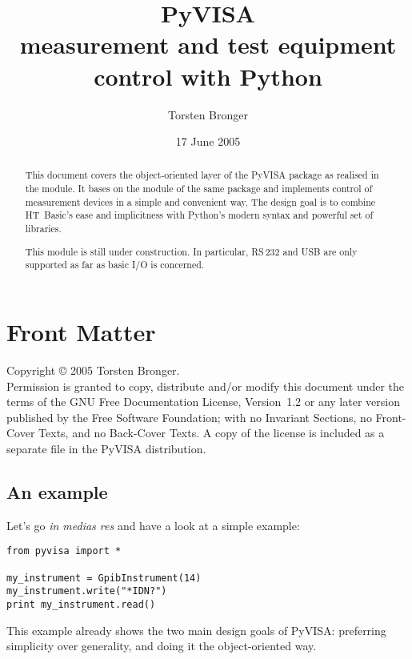 \documentclass{howto}
\title{PyVISA\\[0.5ex]\large measurement and test equipment control with Python}
\author{Torsten Bronger}
\date{17 June 2005}
\begin{document}
\maketitle

\ifhtml
\chapter*{Front Matter\label{front}}
\fi

Copyright \copyright{} 2005 Torsten Bronger.\\
Permission is granted to copy, distribute and/or modify this document under the
terms of the GNU Free Documentation License, Version~1.2 or any later version
published by the Free Software Foundation; with no Invariant Sections, no
Front-Cover Texts, and no Back-Cover Texts.  A copy of the license is included
as a separate file  in the PyVISA distribution.

\begin{abstract}

\noindent
This document covers the object-oriented layer of the PyVISA package as
realised in the  module.  It bases on the  module
of the same package and implements control of measurement devices in a simple
and convenient way.  The design goal is to combine HT~Basic's ease and
implicitness with Python's modern syntax and powerful set of libraries.

This module is still under construction.  In particular, RS\,232 and USB are
only supported as far as basic I/O is concerned.
\end{abstract}

\tableofcontents


\section{An example}

Let's go \emph{in medias res} and have a look at a simple example:
\begin{verbatim}
from pyvisa import *

my_instrument = GpibInstrument(14)
my_instrument.write("*IDN?")
print my_instrument.read()
\end{verbatim}
This example already shows the two main design goals of PyVISA: preferring
simplicity over generality, and doing it the object-oriented way.
\end{document}
